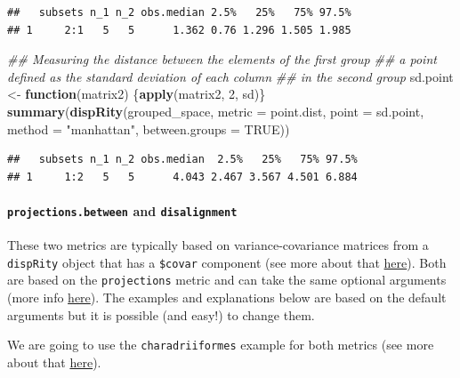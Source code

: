 \documentclass[
]{book}
\newenvironment{Shaded}{\begin{snugshade}}{\end{snugshade}}
\newcommand{\CommentTok}[1]{\textcolor[rgb]{0.56,0.35,0.01}{\textit{#1}}}
\newcommand{\ControlFlowTok}[1]{\textcolor[rgb]{0.13,0.29,0.53}{\textbf{#1}}}
\newcommand{\DataTypeTok}[1]{\textcolor[rgb]{0.13,0.29,0.53}{#1}}
\newcommand{\DecValTok}[1]{\textcolor[rgb]{0.00,0.00,0.81}{#1}}
\newcommand{\KeywordTok}[1]{\textcolor[rgb]{0.13,0.29,0.53}{\textbf{#1}}}
\newcommand{\NormalTok}[1]{#1}
\newcommand{\OtherTok}[1]{\textcolor[rgb]{0.56,0.35,0.01}{#1}}
\newcommand{\StringTok}[1]{\textcolor[rgb]{0.31,0.60,0.02}{#1}}
\begin{document}
\begin{verbatim}
##   subsets n_1 n_2 obs.median 2.5%   25%   75% 97.5%
## 1     2:1   5   5      1.362 0.76 1.296 1.505 1.985
\end{verbatim}

\begin{Shaded}
\begin{Highlighting}[]
\CommentTok{\#\# Measuring the distance between the elements of the first group}
\CommentTok{\#\# a point defined as the standard deviation of each column}
\CommentTok{\#\# in the second group}
\NormalTok{sd.point \textless{}{-}}\StringTok{ }\ControlFlowTok{function}\NormalTok{(matrix2) \{}\KeywordTok{apply}\NormalTok{(matrix2, }\DecValTok{2}\NormalTok{, sd)\}}
\KeywordTok{summary}\NormalTok{(}\KeywordTok{dispRity}\NormalTok{(grouped\_space, }\DataTypeTok{metric =}\NormalTok{ point.dist,}
                 \DataTypeTok{point =}\NormalTok{ sd.point, }\DataTypeTok{method =} \StringTok{"manhattan"}\NormalTok{,}
                 \DataTypeTok{between.groups =} \OtherTok{TRUE}\NormalTok{))}
\end{Highlighting}
\end{Shaded}

\begin{verbatim}
##   subsets n_1 n_2 obs.median  2.5%   25%   75% 97.5%
## 1     1:2   5   5      4.043 2.467 3.567 4.501 6.884
\end{verbatim}

\hypertarget{projections.between-and-disalignment}{%
\paragraph{\texorpdfstring{\texttt{projections.between} and \texttt{disalignment}}{projections.between and disalignment}}\label{projections.between-and-disalignment}}

These two metrics are typically based on variance-covariance matrices from a \texttt{dispRity} object that has a \texttt{\$covar} component (see more about that \protect\hyperlink{covar}{here}).
Both are based on the \texttt{projections} metric and can take the same optional arguments (more info \protect\hyperlink{projections}{here}).
The examples and explanations below are based on the default arguments but it is possible (and easy!) to change them.

We are going to use the \texttt{charadriiformes} example for both metrics (see more about that \protect\hyperlink{covar}{here}).
\end{document}

